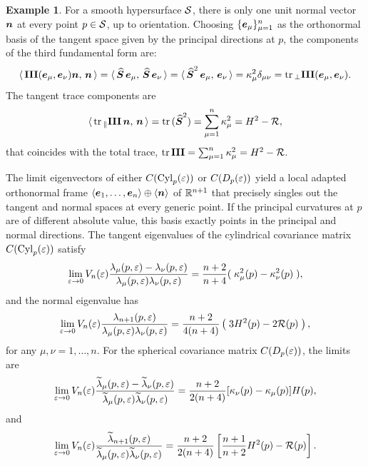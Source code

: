 \documentclass[letterpaper, reqno, 11pt]{amsart}
\theoremstyle{definition}
\newtheorem{example}[theorem]{Example}
\theoremstyle{remark}
\numberwithin{equation}{section}
\begin{document}
\begin{example}
For a smooth hypersurface ${\mathcal S}$, there is only one unit normal vector $\boldsymbol{n}$ at every point $p\in{\mathcal S}$, up to orientation. Choosing $\{\boldsymbol{e}_\mu\}_{\mu=1}^n$ as the orthonormal basis of the tangent space given by the principal directions at $p$, the components of the third fundamental form are:
\begin{equation}
	\langle\, {\boldsymbol{\mathrm{III}}(\boldsymbol{e}_\mu,\boldsymbol{e}_\nu)\boldsymbol{n}},\,{\boldsymbol{n}}\,\rangle=\langle\, {\boldsymbol{\widehat{S}}\,\boldsymbol{e}_\mu},\,{\boldsymbol{\widehat{S}}\,\boldsymbol{e}_\nu}\,\rangle=\langle\, {\boldsymbol{\widehat{S}}^2\,\boldsymbol{e}_\mu},\,{\boldsymbol{e}_\nu}\,\rangle = \kappa^2_\mu\delta_{\mu\nu} = \mathrm{tr}\,_\perp\boldsymbol{\mathrm{III}}(\boldsymbol{e}_\mu,\boldsymbol{e}_\nu).
\end{equation}
The tangent trace components are
\begin{equation}
	\langle\, {\mathrm{tr}\,_\parallel\boldsymbol{\mathrm{III}}\,\boldsymbol{n}},\,{\boldsymbol{n}}\,\rangle = \mathrm{tr}\,(\boldsymbol{\widehat{S}}^2) = \sum_{\mu=1}^n \kappa^2_\mu =  H^2 -\mathcal{R},
\end{equation}
that coincides with the total trace, $\mathrm{tr}\,\boldsymbol{\mathrm{III}} = \sum_{\mu=1}^n \kappa^2_\mu= H^2-\mathcal{R}$.

The limit eigenvectors of either $C(\mathrm{Cyl}_p(\varepsilon))$ or $C(D_p(\varepsilon))$ yield a local adapted orthonormal frame $\langle\boldsymbol{e}_1,\dots,\boldsymbol{e}_n\rangle\oplus\langle\boldsymbol{n}\rangle$ of ${\mathbb R}^{n+1}$ that precisely singles out the tangent and normal spaces at every generic point. If the principal curvatures at $p$ are of different absolute value, this basis exactly points in the principal and normal directions. The tangent eigenvalues of the cylindrical covariance matrix $C(\mathrm{Cyl}_p(\varepsilon))$ satisfy
\begin{equation}
	\lim_{\varepsilon\rightarrow 0}V_n(\varepsilon)\frac{\lambda_\mu(p,\varepsilon)-\lambda_\nu(p,\varepsilon)}{\lambda_\mu(p,\varepsilon)\lambda_\nu(p,\varepsilon)} = \frac{n+2}{n+4}(\;\kappa^2_\mu(p) -\kappa^2_\nu(p)\; ),
\end{equation}
	and the normal eigenvalue has
\begin{equation}
		 \lim_{\varepsilon\rightarrow 0}V_n(\varepsilon)\frac{\lambda_{n+1}(p,\varepsilon)}{\lambda_\mu(p,\varepsilon)\lambda_\nu(p,\varepsilon)} = \frac{n+2}{4(n+4)}\left(\; 3H^2(p)-2\mathcal{R}(p) \; \right),
\end{equation}
	for any $\mu,\nu=1,\dots, n$. 
For the spherical covariance matrix $C(D_p(\varepsilon))$, the limits are
\begin{equation}
	\lim_{\varepsilon\rightarrow 0}V_n(\varepsilon)\frac{\widetilde{\lambda}_\mu(p,\varepsilon) -\widetilde{\lambda}_\nu(p,\varepsilon)}{\widetilde{\lambda}_\mu(p,\varepsilon)\widetilde{\lambda}_\nu(p,\varepsilon)} = \frac{n+2}{2(n+4)}[\kappa_\nu(p) -\kappa_\mu(p)]H(p),
\end{equation}
	and
\begin{equation}
	\lim_{\varepsilon\rightarrow 0}V_n(\varepsilon)\frac{\widetilde{\lambda}_{n+1}(p,\varepsilon)}{\widetilde{\lambda}_\mu(p,\varepsilon)\widetilde{\lambda}_\nu(p,\varepsilon)} = \frac{n+2}{2(n+4)}\left[\frac{n+1}{n+2}H^2(p) -\mathcal{R}(p)\right].
\end{equation}
\end{example}
\end{document}
